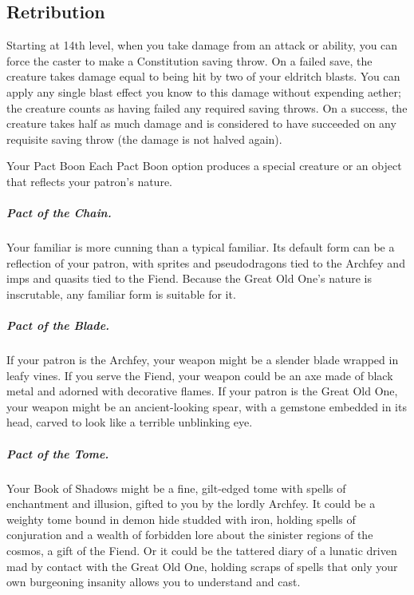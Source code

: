 \subsection{Retribution}

Starting at 14th level, when you take damage from an attack or ability, you can force the caster to make a Constitution saving throw. On a failed save, the creature takes damage equal to being hit by two of your eldritch blasts. You can apply any single blast effect you know to this damage without expending aether; the creature counts as having failed any required saving throws. On a success, the creature takes half as much damage and is considered to have succeeded on any requisite saving throw (the damage is not halved again).

\begin{DndComment}{Your Pact Boon}
    Each Pact Boon option produces a special creature or an object that reflects your patron's nature.
    
    \subparagraph*{Pact of the Chain.} Your familiar is more cunning than a typical familiar. Its default form can be a reflection of your patron, with sprites and pseudodragons tied to the Archfey and imps and quasits tied to the Fiend. Because the Great Old One's nature is inscrutable, any familiar form is suitable for it.
    
    \subparagraph*{Pact of the Blade.} If your patron is the Archfey, your weapon might be a slender blade wrapped in leafy vines. If you serve the Fiend, your weapon could be an axe made of black metal and adorned with decorative flames. If your patron is the Great Old One, your weapon might be an ancient-looking spear, with a gemstone embedded in its head, carved to look like a terrible unblinking eye.
    
    \subparagraph*{Pact of the Tome.} Your Book of Shadows might be a fine, gilt-edged tome with spells of enchantment and illusion, gifted to you by the lordly Archfey. It could be a weighty tome bound in demon hide studded with iron, holding spells of conjuration and a wealth of forbidden lore about the sinister regions of the cosmos, a gift of the Fiend. Or it could be the tattered diary of a lunatic driven mad by contact with the Great Old One, holding scraps of spells that only your own burgeoning insanity allows you to understand and cast.    
\end{DndComment}
